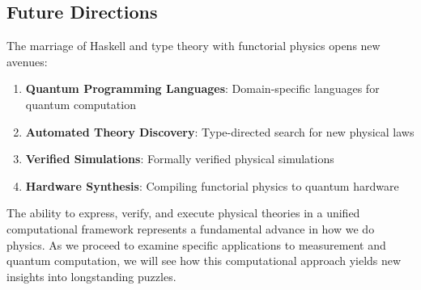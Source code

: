 \subsection{Future Directions}

The marriage of Haskell and type theory with functorial physics opens new avenues:

\begin{enumerate}[leftmargin=*]
\item \textbf{Quantum Programming Languages}: Domain-specific languages for quantum computation
\item \textbf{Automated Theory Discovery}: Type-directed search for new physical laws
\item \textbf{Verified Simulations}: Formally verified physical simulations
\item \textbf{Hardware Synthesis}: Compiling functorial physics to quantum hardware
\end{enumerate}

The ability to express, verify, and execute physical theories in a unified computational framework represents a fundamental advance in how we do physics. As we proceed to examine specific applications to measurement and quantum computation, we will see how this computational approach yields new insights into longstanding puzzles.